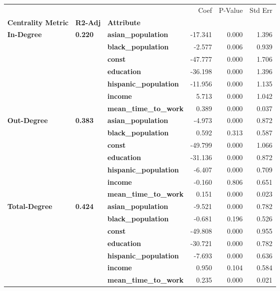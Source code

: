 \begin{tabular}{lllrrr}
\toprule
             &       &                   &    Coef &  P-Value &  Std Err \\
\textbf{Centrality Metric} & \textbf{R2-Adj} & \textbf{Attribute} &         &          &          \\
\midrule
\multirow{7}{*}{\textbf{In-Degree}} & \multirow{7}{*}{\textbf{0.220}} & \textbf{asian\_population} & -17.341 &    0.000 &    1.396 \\
             &       & \textbf{black\_population} &  -2.577 &    0.006 &    0.939 \\
             &       & \textbf{const} & -47.777 &    0.000 &    1.706 \\
             &       & \textbf{education} & -36.198 &    0.000 &    1.396 \\
             &       & \textbf{hispanic\_population} & -11.956 &    0.000 &    1.135 \\
             &       & \textbf{income} &   5.713 &    0.000 &    1.042 \\
             &       & \textbf{mean\_time\_to\_work} &   0.389 &    0.000 &    0.037 \\
\cline{1-6}
\cline{2-6}
\multirow{7}{*}{\textbf{Out-Degree}} & \multirow{7}{*}{\textbf{0.383}} & \textbf{asian\_population} &  -4.973 &    0.000 &    0.872 \\
             &       & \textbf{black\_population} &   0.592 &    0.313 &    0.587 \\
             &       & \textbf{const} & -49.799 &    0.000 &    1.066 \\
             &       & \textbf{education} & -31.136 &    0.000 &    0.872 \\
             &       & \textbf{hispanic\_population} &  -6.407 &    0.000 &    0.709 \\
             &       & \textbf{income} &  -0.160 &    0.806 &    0.651 \\
             &       & \textbf{mean\_time\_to\_work} &   0.151 &    0.000 &    0.023 \\
\cline{1-6}
\cline{2-6}
\multirow{7}{*}{\textbf{Total-Degree}} & \multirow{7}{*}{\textbf{0.424}} & \textbf{asian\_population} &  -9.521 &    0.000 &    0.782 \\
             &       & \textbf{black\_population} &  -0.681 &    0.196 &    0.526 \\
             &       & \textbf{const} & -49.808 &    0.000 &    0.955 \\
             &       & \textbf{education} & -30.721 &    0.000 &    0.782 \\
             &       & \textbf{hispanic\_population} &  -7.693 &    0.000 &    0.636 \\
             &       & \textbf{income} &   0.950 &    0.104 &    0.584 \\
             &       & \textbf{mean\_time\_to\_work} &   0.235 &    0.000 &    0.021 \\
\bottomrule
\end{tabular}
